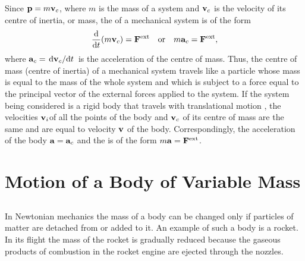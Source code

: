 Since $\vb{p}=m\vb{v}_{c}$, where $m$ is the mass of a system and $\vb{v}_{c}$ is the velocity of its centre of inertia, or mass, the  of a mechanical system is of the form
\begin{equation*}%
\dv{t} (m\vb{v}_{c}) = \vb{F}^{\textrm{ext}} \qor m\vb{a}_{c} = \vb{F}^{\textrm{ext}},
\end{equation*}
where $\vb{a}_{c} = \dv*{\vb{v}_{c}}{t}$ is the acceleration of the centre of mass. Thus, the centre of mass (centre of inertia) of a mechanical system travels like a particle whose mass is equal to the mass of the whole system and which is subject to a force equal to the principal vector of the external forces applied to the system. If the system being considered is a rigid body that travels with translational motion , the velocities $\vb{v}_{i}$of all the points of the body and $\vb{v}_{c}$ of its centre of mass are the same and are equal to velocity $\vb{v}$ of the body. Correspondingly, the accelera­tion of the body $\vb{a} = \vb{a}_{c}$ and the  is of the form
$m \vb{a} = \vb{F}^{\textrm{ext}}$.

\section{Motion of a Body of Variable Mass}
\label{sec-2.6}

\subsection{}\label{2.6.1} In Newtonian mechanics the mass of a body can be changed only if particles of matter are detached from or added to it. An example of such a body is a rocket. In its flight the mass of the rocket is gradually reduced because the gaseous products of combustion in the rocket engine are ejected through the noz­zles.

